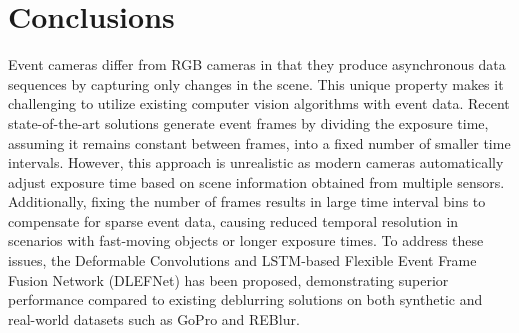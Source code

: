 \documentclass{article}
\begin{document}
\section{Conclusions}
Event cameras differ from RGB cameras in that they produce asynchronous data sequences by capturing only changes in the scene. This unique property makes it challenging to utilize existing computer vision algorithms with event data. Recent state-of-the-art solutions generate event frames by dividing the exposure time, assuming it remains constant between frames, into a fixed number of smaller time intervals. However, this approach is unrealistic as modern cameras automatically adjust exposure time based on scene information obtained from multiple sensors. Additionally, fixing the number of frames results in large time interval bins to compensate for sparse event data, causing reduced temporal resolution in scenarios with fast-moving objects or longer exposure times. To address these issues, the Deformable Convolutions and LSTM-based Flexible Event Frame Fusion Network (DLEFNet) has been proposed, demonstrating superior performance compared to existing deblurring solutions on both synthetic and real-world datasets such as GoPro and REBlur.



\end{document}
